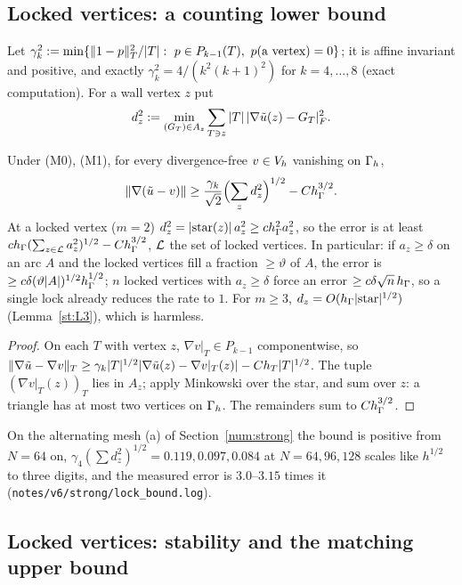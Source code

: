\subsection{Locked vertices: a counting lower bound}

Let $\gamma_k^2:=\min\{\norm{1-p}^2_T/|T|:\ p\in P_{k-1}(T),\ p(\text{a vertex})=0\}$; it is affine invariant and positive, and exactly $\gamma_k^2=4/(k^2(k+1)^2)$ for $k=4,\dots,8$ (exact computation). For a wall vertex $z$ put
\[
d_z^2:=\min_{(G_T)\in A_z}\sum_{T\ni z}|T|\,|\nabla\tilde u(z)-G_T|_F^2 .
\]

\begin{theorem}\label{st:S3}
Under (M0), (M1), for every divergence-free $v\in V_h$ vanishing on $\Gamma_h$,
\[
\lVert \nabla(\tilde u-v)\rVert\ge\frac{\gamma_k}{\sqrt2}\Bigl(\sum_zd_z^2\Bigr)^{1/2}-Ch_\Gamma^{3/2}.
\]
At a locked vertex ($m=2$) $d_z^2=|\text{star}(z)|\,a_z^2\ge ch_\Gamma^2a_z^2$, so the error is at least $ch_\Gamma(\sum_{z\in\mathcal L}a_z^2)^{1/2}-Ch_\Gamma^{3/2}$, $\mathcal L$ the set of locked vertices. In particular: if $a_z\ge\delta$ on an arc $A$ and the locked vertices fill a fraction $\ge\vartheta$ of $A$, the error is $\ge c\delta(\vartheta|A|)^{1/2}h_\Gamma^{1/2}$; $n$ locked vertices with $a_z\ge\delta$ force an error $\ge c\delta\sqrt n\,h_\Gamma$, so a single lock already reduces the rate to $1$. For $m\ge3$, $d_z=O(h_\Gamma|\text{star}|^{1/2})$ (Lemma~\ref{st:L3}), which is harmless.
\end{theorem}

\begin{proof}
On each $T$ with vertex $z$, $\nabla v|_T\in P_{k-1}$ componentwise, so $\lVert \nabla\tilde u-\nabla v\rVert_T\ge\gamma_k|T|^{1/2}|\nabla\tilde u(z)-\nabla v|_T(z)|-Ch_T|T|^{1/2}$. The tuple $(\nabla v|_T(z))_T$ lies in $A_z$; apply Minkowski over the star, and sum over $z$: a triangle has at most two vertices on $\Gamma_h$. The remainders sum to $Ch_\Gamma^{3/2}$.
\end{proof}

On the alternating mesh (a) of Section~\ref{num:strong} the bound is positive from $N=64$ on, $\gamma_4(\sum d_z^2)^{1/2}=0.119,0.097,0.084$ at $N=64,96,128$ scales like $h^{1/2}$ to three digits, and the measured error is $3.0$--$3.15$ times it (\texttt{notes/v6/strong/lock\_bound.log}).

\subsection{Locked vertices: stability and the matching upper bound}\label{st:sec:lock}

